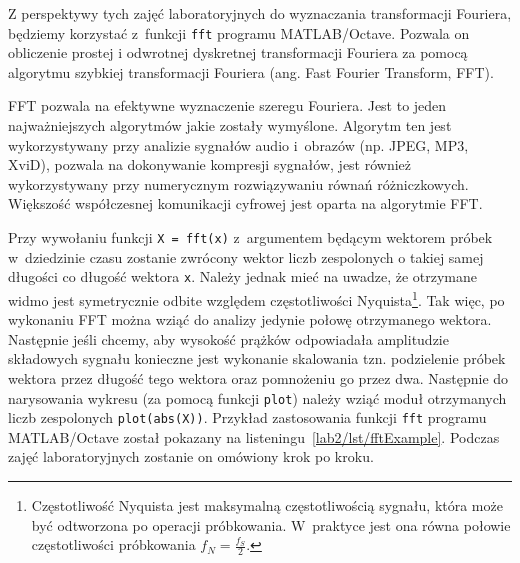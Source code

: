 Z perspektywy tych zajęć laboratoryjnych do wyznaczania transformacji Fouriera, będziemy korzystać z~funkcji \texttt{fft} programu MATLAB/Octave. Pozwala on obliczenie prostej i odwrotnej dyskretnej transformacji Fouriera za pomocą algorytmu szybkiej transformacji Fouriera (ang. Fast Fourier Transform, FFT).

FFT pozwala na efektywne wyznaczenie szeregu Fouriera. Jest to jeden najważniejszych algorytmów jakie zostały wymyślone. Algorytm ten jest wykorzystywany przy analizie sygnałów audio i~obrazów (np. JPEG, MP3, XviD), pozwala na dokonywanie kompresji sygnałów, jest również wykorzystywany przy numerycznym rozwiązywaniu równań różniczkowych. Większość współczesnej komunikacji cyfrowej jest oparta na algorytmie FFT. 

Przy wywołaniu funkcji \texttt{X = fft(x)} z~argumentem będącym wektorem próbek w~dziedzinie czasu zostanie zwrócony wektor liczb zespolonych o takiej samej długości co długość wektora \texttt{x}. Należy jednak mieć na uwadze, że otrzymane widmo jest symetrycznie odbite względem częstotliwości Nyquista\footnote{Częstotliwość Nyquista jest maksymalną częstotliwością sygnału, która może być odtworzona po operacji próbkowania. W~praktyce jest ona równa połowie częstotliwości próbkowania $f_N = \frac{f_S}{2}$.}. Tak więc, po wykonaniu FFT można wziąć do analizy jedynie połowę otrzymanego wektora. Następnie jeśli chcemy, aby wysokość prążków odpowiadała amplitudzie składowych sygnału konieczne jest wykonanie skalowania tzn. podzielenie próbek wektora przez długość tego wektora oraz pomnożeniu go przez dwa. Następnie do narysowania wykresu (za pomocą funkcji \texttt{plot}) należy wziąć moduł otrzymanych liczb zespolonych \texttt{plot(abs(X))}. Przykład zastosowania funkcji \texttt{fft} programu MATLAB/Octave został pokazany na listeningu~\ref{lab2/lst/fftExample}. Podczas zajęć laboratoryjnych zostanie on omówiony krok po kroku.

